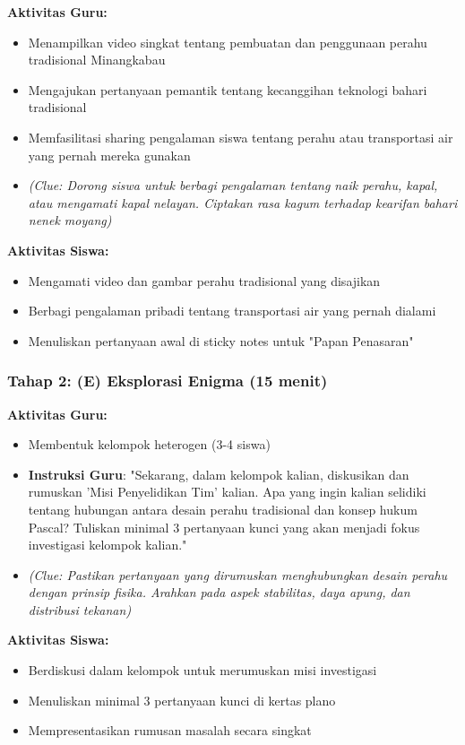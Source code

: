 \documentclass[12pt,a4paper]{article}
\begin{document}
\textbf{Aktivitas Guru:}
\begin{itemize}
\item Menampilkan video singkat tentang pembuatan dan penggunaan perahu tradisional Minangkabau
\item Mengajukan pertanyaan pemantik tentang kecanggihan teknologi bahari tradisional
\item Memfasilitasi sharing pengalaman siswa tentang perahu atau transportasi air yang pernah mereka gunakan
\item \textit{(Clue: Dorong siswa untuk berbagi pengalaman tentang naik perahu, kapal, atau mengamati kapal nelayan. Ciptakan rasa kagum terhadap kearifan bahari nenek moyang)}
\end{itemize}

\textbf{Aktivitas Siswa:}
\begin{itemize}
\item Mengamati video dan gambar perahu tradisional yang disajikan
\item Berbagi pengalaman pribadi tentang transportasi air yang pernah dialami
\item Menuliskan pertanyaan awal di sticky notes untuk "Papan Penasaran"
\end{itemize}

\subsubsection{Tahap 2: (E) Eksplorasi Enigma (15 menit)}

\textbf{Aktivitas Guru:}
\begin{itemize}
\item Membentuk kelompok heterogen (3-4 siswa)
\item \textbf{Instruksi Guru}: "Sekarang, dalam kelompok kalian, diskusikan dan rumuskan 'Misi Penyelidikan Tim' kalian. Apa yang ingin kalian selidiki tentang hubungan antara desain perahu tradisional dan konsep hukum Pascal? Tuliskan minimal 3 pertanyaan kunci yang akan menjadi fokus investigasi kelompok kalian."
\item \textit{(Clue: Pastikan pertanyaan yang dirumuskan menghubungkan desain perahu dengan prinsip fisika. Arahkan pada aspek stabilitas, daya apung, dan distribusi tekanan)}
\end{itemize}

\textbf{Aktivitas Siswa:}
\begin{itemize}
\item Berdiskusi dalam kelompok untuk merumuskan misi investigasi
\item Menuliskan minimal 3 pertanyaan kunci di kertas plano
\item Mempresentasikan rumusan masalah secara singkat
\end{itemize}
\end{document}
